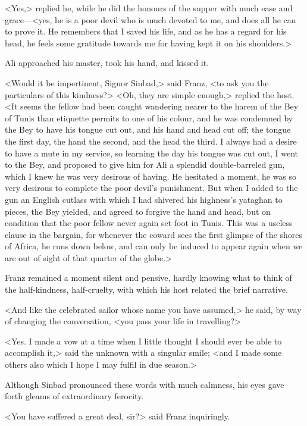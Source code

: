  <Yes,> replied he, while he did the honours of the supper with much ease and grace—<yes, he is a poor devil who is much devoted to me, and does all he can to prove it. He remembers that I saved his life, and as he has a regard for his head, he feels some gratitude towards me for having kept it on his shoulders.> 

 Ali approached his master, took his hand, and kissed it. 

 <Would it be impertinent, Signor Sinbad,> said Franz, <to ask you the particulars of this kindness?>  <Oh, they are simple enough,> replied the host. <It seems the fellow had been caught wandering nearer to the harem of the Bey of Tunis than etiquette permits to one of his colour, and he was condemned by the Bey to have his tongue cut out, and his hand and head cut off; the tongue the first day, the hand the second, and the head the third. I always had a desire to have a mute in my service, so learning the day his tongue was cut out, I went to the Bey, and proposed to give him for Ali a splendid double-barreled gun, which I knew he was very desirous of having. He hesitated a moment, he was so very desirous to complete the poor devil's punishment. But when I added to the gun an English cutlass with which I had shivered his highness's yataghan to pieces, the Bey yielded, and agreed to forgive the hand and head, but on condition that the poor fellow never again set foot in Tunis. This was a useless clause in the bargain, for whenever the coward sees the first glimpse of the shores of Africa, he runs down below, and can only be induced to appear again when we are out of sight of that quarter of the globe.> 

 Franz remained a moment silent and pensive, hardly knowing what to think of the half-kindness, half-cruelty, with which his host related the brief narrative. 

 <And like the celebrated sailor whose name you have assumed,> he said, by way of changing the conversation, <you pass your life in travelling?> 

 <Yes. I made a vow at a time when I little thought I should ever be able to accomplish it,> said the unknown with a singular smile; <and I made some others also which I hope I may fulfil in due season.> 

 Although Sinbad pronounced these words with much calmness, his eyes gave forth gleams of extraordinary ferocity. 

 <You have suffered a great deal, sir?> said Franz inquiringly. 

